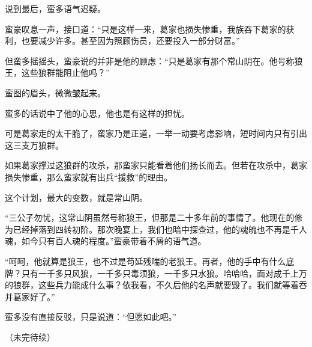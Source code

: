\begin{this_body}
说到最后，蛮多语气迟疑。

蛮豪叹息一声，接口道：“只是这样一来，葛家也损失惨重，我族吞下葛家的获利，也要减少许多。甚至因为照顾伤员，还要投入一部分财富。”

但蛮多摇摇头，蛮豪说的并非是他的顾虑：“只是葛家有那个常山阴在。他号称狼王，这些狼群能阻止他吗？”

蛮图的眉头，微微皱起来。

蛮多的话说中了他的心思，他也是有这样的担忧。

可是葛家走的太干脆了，蛮家乃是正道，一举一动要考虑影响，短时间内只有引出这三支万狼群。

如果葛家撑过这狼群的攻杀，那蛮家只能看着他们扬长而去。但若在攻杀中，葛家损失惨重，那么蛮家就有出兵“援救”的理由。

这个计划，最大的变数，就是常山阴。

“三公子勿忧，这常山阴虽然号称狼王，但那是二十多年前的事情了。他现在的修为已经掉落到四转初阶。那次晚宴上，我们也暗中探查过，他的魂魄也不再是千人魂，如今只有百人魂的程度。”蛮豪带着不屑的语气道。

“呵呵，他就算是狼王，也不过是苟延残喘的老狼王。再者，他的手中有什么底牌？只有一千多只风狼，一千多只毒须狼，一千多只水狼。哈哈哈，面对成千上万的狼群，这些兵力能成什么事？依我看，不久后他的名声就要毁了。我们就等着吞并葛家好了。”

蛮多没有直接反驳，只是说道：“但愿如此吧。”

（未完待续）

\end{this_body}

